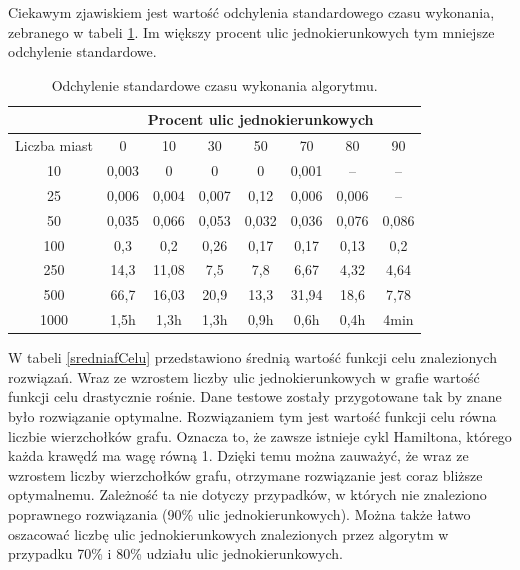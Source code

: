 \documentclass[11pt,a4paper,twoside]{article}
\begin{document}
Ciekawym zjawiskiem jest wartość odchylenia standardowego czasu wykonania, zebranego w tabeli \ref{odchylenieCzasuWykonania}. Im większy procent ulic jednokierunkowych tym mniejsze odchylenie standardowe.

\bgroup
\def\arraystretch{1.2}
\begin{table}[ht]
\centering
\begin{tabular}{|c|c|c|c|c|c|c|c|}
\hline
 & \multicolumn{7}{c|}{Procent ulic jednokierunkowych}\\\hline
Liczba miast & 0 & 10 & 30 & 50 & 70& 80& 90\\  \hline
10& 0,003& 0& 0& 0& 0,001& --& --\\ \hline
25& 0,006& 0,004& 0,007& 0,12& 0,006& 0,006& --\\ \hline
50& 0,035& 0,066& 0,053& 0,032& 0,036& 0,076& 0,086\\ \hline
100& 0,3& 0,2& 0,26& 0,17& 0,17& 0,13& 0,2\\ \hline
250& 14,3& 11,08& 7,5& 7,8& 6,67& 4,32& 4,64\\ \hline
500& 66,7& 16,03& 20,9& 13,3& 31,94& 18,6& 7,78\\ \hline
1000& 1,5h& 1,3h& 1,3h& 0,9h& 0,6h& 0,4h& 4min\\ \hline
\end{tabular}
\caption{Odchylenie standardowe czasu wykonania algorytmu.}
\label{odchylenieCzasuWykonania}
\end{table}
\egroup

W tabeli \ref{sredniafCelu} przedstawiono średnią wartość funkcji celu znalezionych rozwiązań. Wraz ze wzrostem liczby ulic jednokierunkowych w grafie wartość funkcji celu drastycznie rośnie. Dane testowe zostały przygotowane tak by znane było rozwiązanie optymalne. Rozwiązaniem tym jest wartość funkcji celu równa liczbie wierzchołków grafu. Oznacza to, że zawsze istnieje cykl Hamiltona, którego każda krawędź ma wagę równą 1. Dzięki temu można zauważyć, że wraz ze wzrostem liczby wierzchołków grafu, otrzymane rozwiązanie jest coraz bliższe optymalnemu. Zależność ta nie dotyczy przypadków, w których nie znaleziono poprawnego rozwiązania (90\% ulic jednokierunkowych). Można także łatwo oszacować liczbę ulic jednokierunkowych znalezionych przez algorytm w przypadku 70\% i 80\% udziału ulic jednokierunkowych.
\end{document}
